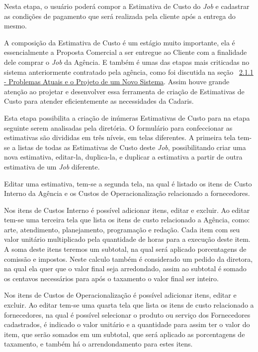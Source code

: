 \documentclass[
  12pt,            %
  openany,
  oneside,
  a4paper,         %
  english,      %
  brazil
]{article}
\numberwithin{figure}{section}
\numberwithin{table}{section}
\newcounter{subsubsubsection}[subsubsection]
\begin{document}

Nesta etapa, o usuário poderá compor a Estimativa de Custo do \textit{Job} e cadastrar as condições de pagamento que será realizada pela cliente após a entrega do mesmo.

A composição da Estimativa de Custo é um estágio muito importante, ela é essencialmente a Proposta Comercial a ser entregue ao Cliente com a finalidade dele comprar o \textit{Job} da Agência. E também é umas das etapas mais criticadas no sistema anteriormente contratado pela agência, como foi discutida na seção ~\hyperref[sec:2.1.1]{2.1.1 - Problemas Atuais e o Projeto de um Novo Sistema}. Assim houve grande atenção ao projetar e desenvolver essa ferramenta de criação de Estimativas de Custo para atender eficientemente as necessidades da Cadaris.

Esta etapa possibilita a criação de inúmeras Estimativas de Custo para na etapa seguinte serem analisadas pela diretória. O formulário para confeccionar as estimativas são divididas em três níveis, em telas diferentes. A primeira tela tem-se a listas de todas as Estimativas de Custo deste \textit{Job}, possibilitando criar uma nova estimativa, editar-la, duplica-la, e duplicar a estimativa a partir de outra estimativa de um \textit{Job} diferente.

Editar uma estimativa, tem-se a segunda tela, na qual é listado os itens de Custo Interno da Agência e os Custos de Operacionalização relacionado a fornecedores.

Nos itens de Custos Interno é possível adicionar itens, editar e excluir. Ao editar tem-se uma terceira tela que lista os itens de custo relacionado a Agência, como: arte, atendimento, planejamento, programação e redação. Cada item com seu valor unitário multiplicado pela quantidade de horas para a execução deste item. A soma deste itens teremos um subtotal, na qual será aplicado porcentagens de comissão e impostos. Neste calculo também é considerado um pedido da diretora, na qual ela quer que o valor final seja arredondado, assim ao subtotal é somado os centavos necessários para após o taxamento o valor final ser inteiro.

Nos itens de Custos de Operacionalização é possível adicionar itens, editar e excluir. Ao editar tem-se uma quarta tela que lista os itens de custo relacionado a fornecedores, na qual é possível selecionar o produto ou serviço dos Fornecedores cadastrados, é indicado o valor unitário e a quantidade para assim ter o valor do item, que serão somados em um subtotal, que será aplicado as porcentagens de taxamento, e também há o arrendondamento para estes itens.
\end{document}
